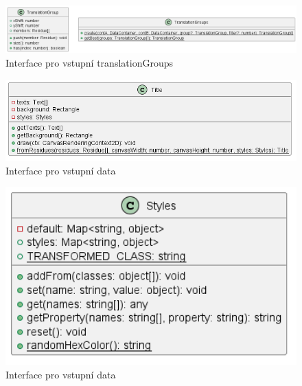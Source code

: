 \begin{figure}[H]
  \centering
  \includegraphics[width=145mm]{../img/translationGroups.png}
  \caption{Interface pro vstupní translationGroups}
\end{figure}

\begin{figure}[H]
  \centering
  \includegraphics[width=145mm]{../img/title.png}
  \caption{Interface pro vstupní data}
\end{figure}

\begin{figure}[H]
  \centering
  \includegraphics[width=145mm]{../img/styles.png}
  \caption{Interface pro vstupní data}
\end{figure}

